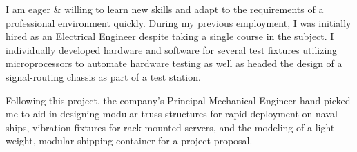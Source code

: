 \documentclass[12pt, a4paper]{awesome-cv}
\begin{document}
\begin{cvletter}
\quad I am eager \& willing to learn new skills and adapt to the requirements of a professional environment quickly. During my previous employment, I was initially hired as an Electrical Engineer despite taking a single course in the subject. I individually developed hardware and software for several test fixtures utilizing microprocessors to automate hardware testing as well as headed the design of a signal-routing chassis as part of a test station.

\quad Following this project, the company's Principal Mechanical Engineer hand picked me to aid in designing modular truss structures for rapid deployment on naval ships, vibration fixtures for rack-mounted servers, and the modeling of a light-weight, modular shipping container for a project proposal.

\end{cvletter}


\makeletterclosing
\end{document}
